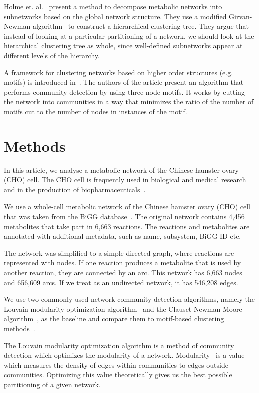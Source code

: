 Holme et. al.~\cite{holme2003subnetwork} present a method to decompose metabolic
networks into subnetworks based on the global network structure. They use a
modified Girvan-Newman algorithm~\cite{girvan2002community} to construct a
hierarchical clustering tree. They argue that instead of looking at a particular
partitioning of a network, we should look at the hierarchical clustering tree as
whole, since well-defined subnetworks appear at different levels of the
hierarchy.

A framework for clustering networks based on higher order structures
(e.g. motifs) is introduced in~\cite{benson2016higher}. The authors of the
article present an algorithm that performs community detection by using three
node motifs. It works by cutting the network into communities in a way that
minimizes the ratio of the number of motifs cut to the number of nodes in
instances of the motif.

\section{Methods}
\label{sec:methods}

In this article, we analyse a metabolic network of the Chinese hamster
ovary (CHO) cell. The CHO cell is frequently used in biological and medical
research and in the production of biopharmaceuticals~\cite{chocons}.

We use a whole-cell metabolic network of the Chinese hamster ovary (CHO)
cell that was taken from the BiGG database~\cite{bigg,chocons}. The original
network contains 4,456 metabolites that take part in 6,663 reactions. The
reactions and metabolites are annotated with additional metadata, such as name,
subsystem, BiGG ID etc.

The network was simplified to a simple directed graph, where reactions are
represented with nodes. If one reaction produces a metabolite that is used by
another reaction, they are connected by an arc. This network has 6,663 nodes and
656,609 arcs. If we treat as an undirected network, it has 546,208 edges.

We use two commonly used network community detection algorithms, namely the
Louvain modularity optimization algorithm~\cite{blondel2008fast} and the
Clauset-Newman-Moore algorithm~\cite{clauset2004finding}, as the baseline and
compare them to motif-based clustering methods~\cite{benson2016higher}.

The Louvain modularity optimization algorithm is a method of community detection
which optimizes the modularity of a
network. Modularity~\cite{girvan2002community} is a value which measures the
density of edges within communities to edges outside communities. Optimizing
this value theoretically gives us the best possible partitioning of a given
network.

